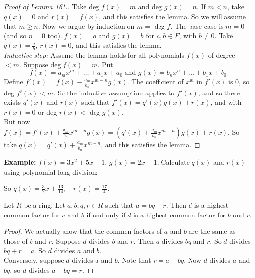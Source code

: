 \begin{proof}[Proof of Lemma 161.]
	Take deg $f(x) = m$ and deg $g(x) = n$. If $m < n$, take $q(x) =0$ and $r(x) = f(x)$, and this satisfies the lemma. So we will assume that $m \geq n$. Now we argue by induction on $m = $ deg $f$. The base case is $m = 0$ (and so $n = 0$ too). $f(x) = a$ and $g(x) = b$ for $a,b \in F$, with $b \neq 0$. Take $q(x) = \frac{a}{b}$, $r(x) = 0$, and this satisfies the lemma.\\  
	\textit{Inductive step:} Assume the lemma holds for all polynomials $f(x)$ of degree $<m$. Suppose deg $f(x) = m$. Put \[f(x) = a_mx^m + \dots + a_1x + a_0 \text{ and } g(x) = b_nx^n + \dots + b_1x + b_0\] Define $f'(x) = f(x) - \frac{a_m}{b_n}x^{m-n}g(x)$. The coefficient of $x^m$ in $f'(x)$ is $0$, so deg $f'(x) < m$. So the inductive assumption applies to $f'(x)$, and so there exists $q'(x)$ and $r(x)$ such that $f'(x) = q'(x)g(x) + r(x)$, and with $r(x) = 0$ or deg $r(x) <$ deg $g(x)$.\vspace*{5pt}\\ But now $f(x) = f'(x) + \frac{a_m}{b_n}x^{m-n}g(x) = (q'(x) + \frac{a_m}{b_n}x^{m-n})g(x) + r(x).$ So take $q(x) = q'(x) + \frac{a_m}{b_n}x^{m-n}$, and this satisfies the lemma.
\end{proof}\vspace*{5pt}

 \textbf{Example:} $f(x) = 3x^2 + 5x + 1$, $g(x)= 2x -1$. Calculate $q(x)$ and $r(x)$ using polynomial long division:\\


So $q(x) = \frac{3}{2}x + \frac{13}{14}, \quad r(x) = \frac{17}{4}$. \\

\begin{proposition} Let $R$ be a ring. Let $a,b,q,r \in R$ such that $a = bq + r$. Then $d$ is a highest common factor for $a$ and $b$ if and only if $d$ is a highest common factor for $b$ and $r$.	
\end{proposition}

\begin{proof}
We actually show that the common factors of $a$ and $b$ are the same as those of $b$ and $r$. Suppose $d$ divides $b$ and $r$. Then $d$ divides $bq$ and $r$. So $d$ divides $bq + r = a$. So $d$ divides $a$ and $b$.\\
Conversely, suppose $d$ divides $a$ and $b$. Note that $r = a - bq$. Now $d$ divides $a$ and $bq$, so $d$ divides $a - bq = r$.	
\end{proof}\vspace*{5pt}

